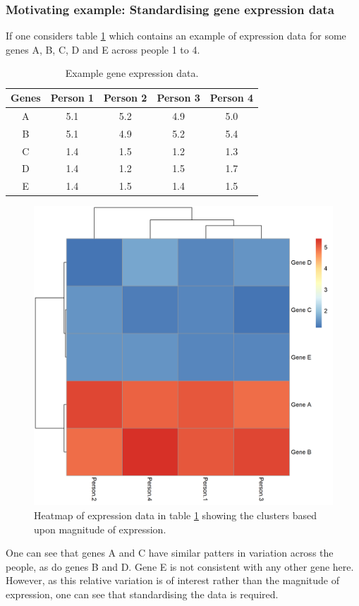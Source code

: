 \documentclass[12pt]{article} %
\begin{document}
\subsubsection{Motivating example: Standardising gene expression data} \label{sec:motivating_example_standardisation}
If one considers table \ref{table:example_gene_expression_data} which contains an example of expression data for some genes A, B, C, D and E across people 1 to 4.
\begin{table}[!htb] 
	\centering
	\begin{tabular}{c|cccc} 
		Genes 	& Person 1	& Person 2	& Person 3	& Person 4	\\ 
		\hline
		A 		& 5.1		& 5.2 		& 4.9		& 5.0		\\
		B 		& 5.1		& 4.9		& 5.2		& 5.4		\\
		C 		& 1.4		& 1.5		& 1.2		& 1.3		\\
		D 		& 1.4		& 1.2		& 1.5		& 1.7		\\
		E 		& 1.4		& 1.5		& 1.4		& 1.5		
	\end{tabular}
	\caption{Example gene expression data.}
	\label{table:example_gene_expression_data}
\end{table}
\begin{figure}[!htb]
	\centering
	\includegraphics[scale=0.55]{Images/Examples/example_expression_data.png}
	\caption{Heatmap of expression data in table \ref{table:example_gene_expression_data} showing the clusters based upon magnitude of expression.}
	\label{fig:example_expression_data}
\end{figure}
One can see that genes A and C have similar patters in variation across the people, as do genes B and D. Gene E is not consistent with any other gene here. However, as this relative variation is of interest rather than the magnitude of expression, one can see that standardising the data is required. 
\end{document}
